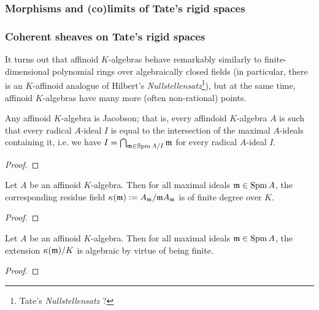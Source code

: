         \subsubsection{Morphisms and (co)limits of Tate's rigid spaces}
        
        \subsubsection{Coherent sheaves on Tate's rigid spaces}
            It turns out that affinoid $K$-algebras behave remarkably similarly to finite-dimensional polynomial rings over algebraically closed fields (in particular, there is an $K$-affinoid analogue of Hilbert's \textit{Nullstellensatz}\footnote{Tate's \textit{Nullstellensatz} ?}), but at the same time, affinoid $K$-algebras have many more (often non-rational) points. 
            \begin{lemma} \label{lemma: tate_algebras_over_non_archimedean_fields_are_jacobson}
                Any affinoid $K$-algebra is Jacobson; that is, every affindoid $K$-algebra $A$ is such that every radical $A$-ideal $I$ is equal to the intersection of the maximal $A$-ideals containing it, i.e. we have $I = \bigcap_{\mathfrak{m} \in \operatorname{Spm} A/I} \mathfrak{m}$ for every radical $A$-ideal $I$.
            \end{lemma}
                \begin{proof}
                    
                \end{proof}
            \begin{theorem} \label{theorem: tate_nullstellensatz}
                Let $A$ be an affinoid $K$-algebra. Then for all maximal ideals $\mathfrak{m} \in \operatorname{Spm} A$, the corresponding residue field $\kappa(\mathfrak{m}) := A_{\mathfrak{m}}/\mathfrak{m} A_{\mathfrak{m}}$ is of finite degree over $K$. 
            \end{theorem}
                \begin{proof}
                    
                \end{proof}   
            \begin{corollary}
                Let $A$ be an affinoid $K$-algebra. Then for all maximal ideals $\mathfrak{m} \in \operatorname{Spm} A$, the extension $\kappa(\mathfrak{m})/K$ is algebraic by virtue of being finite.
            \end{corollary}
        
            \begin{theorem} \label{theorem: tate_acyclicity_theorem_for_rigid_spaces}
                
            \end{theorem}
                \begin{proof}
                    
                \end{proof}
    
